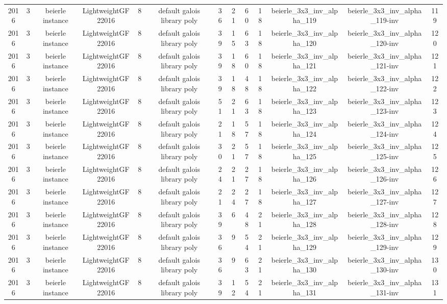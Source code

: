 \begin{tabular}{c c c c c c c c c c c c c}
2016 & 3 & beierle instance & LightweightGF22016 & 8 & default galois library poly & 36 & 21 & 60 & 18 & beierle_3x3_inv_alpha_119 & beierle_3x3_inv_alpha_119-inv & 119 \\
2016 & 3 & beierle instance & LightweightGF22016 & 8 & default galois library poly & 39 & 15 & 63 & 18 & beierle_3x3_inv_alpha_120 & beierle_3x3_inv_alpha_120-inv & 120 \\
2016 & 3 & beierle instance & LightweightGF22016 & 8 & default galois library poly & 39 & 18 & 60 & 18 & beierle_3x3_inv_alpha_121 & beierle_3x3_inv_alpha_121-inv & 121 \\
2016 & 3 & beierle instance & LightweightGF22016 & 8 & default galois library poly & 39 & 18 & 48 & 18 & beierle_3x3_inv_alpha_122 & beierle_3x3_inv_alpha_122-inv & 122 \\
2016 & 3 & beierle instance & LightweightGF22016 & 8 & default galois library poly & 51 & 21 & 63 & 18 & beierle_3x3_inv_alpha_123 & beierle_3x3_inv_alpha_123-inv & 123 \\
2016 & 3 & beierle instance & LightweightGF22016 & 8 & default galois library poly & 21 & 18 & 57 & 18 & beierle_3x3_inv_alpha_124 & beierle_3x3_inv_alpha_124-inv & 124 \\
2016 & 3 & beierle instance & LightweightGF22016 & 8 & default galois library poly & 30 & 21 & 57 & 18 & beierle_3x3_inv_alpha_125 & beierle_3x3_inv_alpha_125-inv & 125 \\
2016 & 3 & beierle instance & LightweightGF22016 & 8 & default galois library poly & 24 & 21 & 27 & 18 & beierle_3x3_inv_alpha_126 & beierle_3x3_inv_alpha_126-inv & 126 \\
2016 & 3 & beierle instance & LightweightGF22016 & 8 & default galois library poly & 21 & 24 & 27 & 18 & beierle_3x3_inv_alpha_127 & beierle_3x3_inv_alpha_127-inv & 127 \\
2016 & 3 & beierle instance & LightweightGF22016 & 8 & default galois library poly & 39 & 6 & 48 & 21 & beierle_3x3_inv_alpha_128 & beierle_3x3_inv_alpha_128-inv & 128 \\
2016 & 3 & beierle instance & LightweightGF22016 & 8 & default galois library poly & 36 & 9 & 54 & 21 & beierle_3x3_inv_alpha_129 & beierle_3x3_inv_alpha_129-inv & 129 \\
2016 & 3 & beierle instance & LightweightGF22016 & 8 & default galois library poly & 36 & 9 & 63 & 21 & beierle_3x3_inv_alpha_130 & beierle_3x3_inv_alpha_130-inv & 130 \\
2016 & 3 & beierle instance & LightweightGF22016 & 8 & default galois library poly & 39 & 12 & 54 & 21 & beierle_3x3_inv_alpha_131 & beierle_3x3_inv_alpha_131-inv & 131 \\

\end{tabular}
